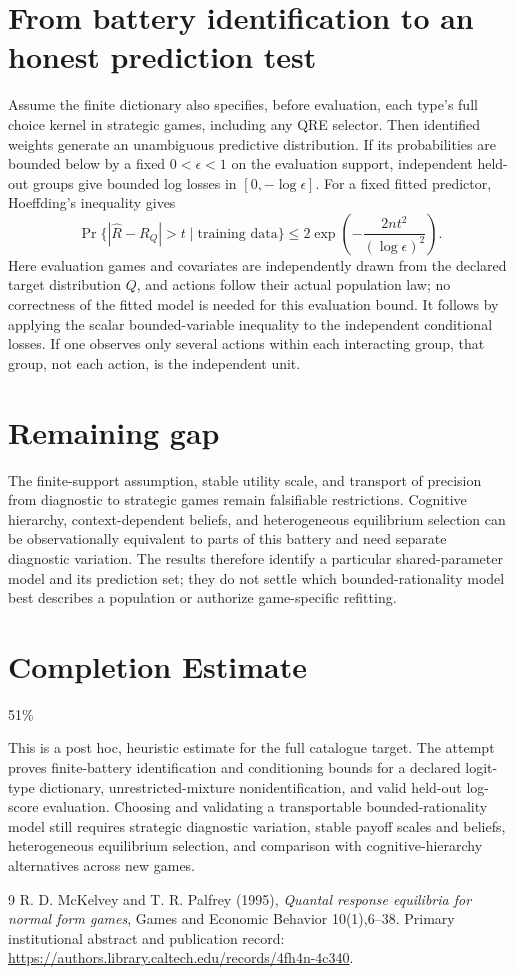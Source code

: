 \documentclass[11pt]{article}
\theoremstyle{definition}
\begin{document}
\section*{From battery identification to an honest prediction test}
Assume the finite dictionary also specifies, before evaluation, each
type's full choice kernel in strategic games, including any QRE selector.
Then identified weights generate an unambiguous predictive distribution.
If its probabilities are bounded below by a fixed $0<\epsilon<1$ on the
evaluation support, independent held-out groups give bounded log losses
in $[0,-\log\epsilon]$. For a fixed fitted predictor, Hoeffding's
inequality gives
\[
 \Pr\{|\widehat R-R_Q|>t\mid\text{training data}\}
 \le2\exp\!\left(-\frac{2nt^2}{(\log\epsilon)^2}\right).  \tag{3}
\]
Here evaluation games and covariates are independently drawn from the
declared target distribution $Q$, and actions follow their actual
population law; no correctness of the fitted model is needed for this
evaluation bound. It follows by applying the scalar bounded-variable
inequality to the independent conditional losses. If one observes only
several actions within each interacting group, that group, not each action,
is the independent unit.

\section*{Remaining gap}
The finite-support assumption, stable utility scale, and transport of
precision from diagnostic to strategic games remain falsifiable
restrictions. Cognitive hierarchy, context-dependent beliefs, and
heterogeneous equilibrium selection can be observationally equivalent
to parts of this battery and need separate diagnostic variation. The
results therefore identify a particular shared-parameter model and its
prediction set; they do not settle which bounded-rationality model best
describes a population or authorize game-specific refitting.

\section{Completion Estimate}
51\%

This is a post hoc, heuristic estimate for the full catalogue target.
The attempt proves finite-battery identification and conditioning bounds for a declared logit-type dictionary, unrestricted-mixture nonidentification, and valid held-out log-score evaluation. Choosing and validating a transportable bounded-rationality model still requires strategic diagnostic variation, stable payoff scales and beliefs, heterogeneous equilibrium selection, and comparison with cognitive-hierarchy alternatives across new games.

\begin{thebibliography}{9}
 R. D. McKelvey and T. R. Palfrey (1995), \emph{Quantal
response equilibria for normal form games}, Games and Economic Behavior
10(1),6--38. Primary institutional abstract and publication record:
\url{https://authors.library.caltech.edu/records/4fh4n-4c340}.
\end{thebibliography}
\end{document}
